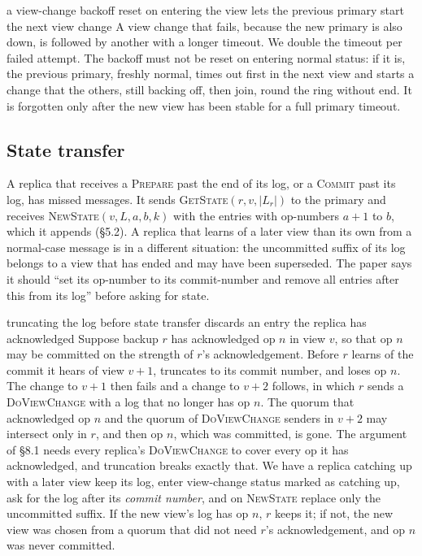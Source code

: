 \documentclass[11pt,a4paper]{article}
\theoremstyle{plain}
\theoremstyle{definition}
\theoremstyle{remark}
\newcommand{\msg}[1]{\textsc{#1}}
\begin{document}
\begin{departure}{a view-change backoff reset on entering the view lets the previous primary start the next view change}
A view change that
fails, because the new primary is also down, is followed by another with
a longer timeout. We double the timeout per failed attempt. The backoff
must not be reset on entering normal status: if it is, the previous
primary, freshly normal, times out first in the next view and starts a
change that the others, still backing off, then join, round the ring
without end. It is forgotten only after the new view has been stable for
a full primary timeout.
\end{departure}

\subsection{State transfer}
\label{app:transfer}

A replica that receives a \msg{Prepare} past the end of its log, or a
\msg{Commit} past its log, has missed messages. It sends
\msg{GetState}$(r, v, |L_r|)$ to the primary and receives
\msg{NewState}$(v, L, a, b, k)$ with the entries with op-numbers $a+1$
to $b$, which it appends (\S5.2). A replica that learns of a later view than its own
from a normal-case message is in a different situation: the uncommitted
suffix of its log belongs to a view that has ended and may have been
superseded. The paper says it should ``set its op-number to its
commit-number and remove all entries after this from its log'' before
asking for state.

\begin{departure}{truncating the log before state transfer discards an entry the replica has acknowledged}
Suppose backup $r$ has acknowledged
op $n$ in view $v$, so that op $n$ may be committed on the strength of
$r$'s acknowledgement. Before $r$ learns of the commit it hears of view
$v+1$, truncates to its commit number, and loses op $n$. The change to
$v+1$ then fails and a change to $v+2$ follows, in which $r$ sends a
\msg{DoViewChange} with a log that no longer has op $n$. The quorum that
acknowledged op $n$ and the quorum of \msg{DoViewChange} senders in $v+2$
may intersect only in $r$, and then op $n$, which was committed, is gone.
The argument of \S8.1 needs every replica's \msg{DoViewChange} to cover
every op it has acknowledged, and truncation breaks
exactly that. We have a replica catching up with a later view keep its
log, enter view-change status marked as catching up, ask for the log
after its \emph{commit number}, and on \msg{NewState} replace only the
uncommitted suffix. If the new view's log has op $n$, $r$ keeps it; if
not, the new view was chosen from a quorum that did not need $r$'s
acknowledgement, and op $n$ was never committed.
\end{departure}
\end{document}

